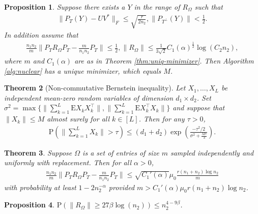 \documentclass[13pt]{article}
\newtheorem{thm}{Theorem}[section]
\newtheorem{prop}[thm]{Proposition}
\theoremstyle{plain}
\newcommand{\E}{\bm{\mathrm{E}}}
\renewcommand{\P}{\bm{\mathrm{P}}}
\newcommand{\set}[1]{{\{#1\}}}
\begin{document}
\begin{prop}
    Suppose there exists a $Y$ in the range of $R_\Omega$ such that
    \[
        \begin{aligned}
            \|P_T(Y) - UV^\ast\|_F \le \sqrt{\frac{r}{2n_2}}, \|P_{T^\perp}(Y)\| < \frac{1}{2}.
        \end{aligned}
    \]
    In addition assume that
    \[
        \begin{aligned}
            \frac{n_1n_2}{m}\|P_TR_\Omega P_T - \frac{m}{n_1n_2}P_T\| \le \frac{1}{2},
            \|R_\Omega\| \le \frac{1}{3\sqrt{2}} C_1(\alpha)^{\frac{1}{2}} \log(C_2n_2),
        \end{aligned}
    \]
    where $m$ and $C_1(\alpha)$ are as in Theorem \ref{thm:uniq-minimizer}.
    Then Algorithm \ref{alg:nuclear} has a unique minimizer, which equals $M$.
\end{prop}

\begin{thm}[Non-commutative Bernstein inequality]
    Let $X_1,\ldots, X_L$ be independent mean-zero random variables of dimension
    $d_1 \times d_2$. Set $\sigma^2 = \max \set{\|\sum_{k=1}^{L} \E X_kX_k^\top\|, \|\sum_{k=1}^{L} \E X_k^\top X_k\|}$
    and suppose that $\|X_k\| \le M$ almost surely for all $k \in [L]$. Then for any
    $\tau > 0$,
    \[
        \begin{aligned}
            \P\left( \|\sum_{k=1}^{L} X_k\| > \tau \right) \le (d_1+d_2) \exp\left( \frac{-\tau^2/2}{\sigma^2 + \frac{M\tau}{3}} \right) .
        \end{aligned}
    \]
\end{thm}

\begin{thm}
    Suppose $\Omega$ is a set of entries of size $m$ sampled independently and uniformly
    with replacement. Then for all $\alpha > 0$,
    \[
        \begin{aligned}
            \frac{n_1n_2}{m}\|P_T R_\Omega P_T - \frac{m}{n_1n_2}P_T\| \le \sqrt{C_1'(\alpha)}\mu_0\frac{r(n_1+n_2)\log n_2}{m}
        \end{aligned}
    \]
    with probability at least $1 - 2n_2^{-\alpha}$ provided
    $m > C_1'(\alpha)\mu_0 r(n_1+n_2)\log n_2$.
\end{thm}

\begin{prop}
    $\P\left(\|R_\Omega\| \ge 27 \beta \log(n_2)\right) \le n_2^{4-9\beta}$.
\end{prop}

\newpage

\printbibliography[heading=bibintoc]
\end{document}
